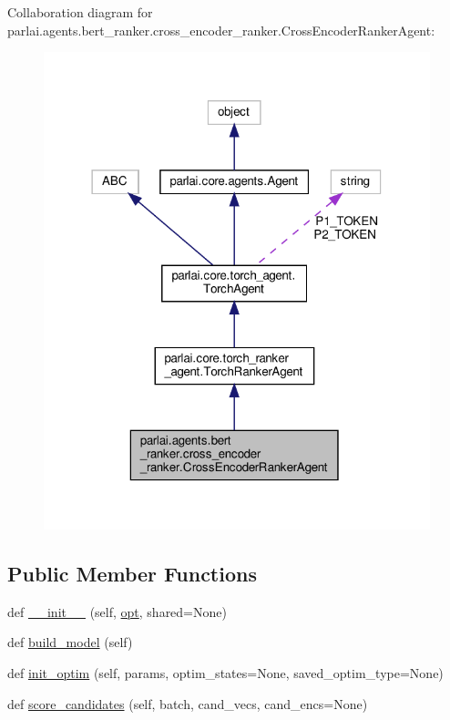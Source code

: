 Collaboration diagram for parlai.\+agents.\+bert\+\_\+ranker.\+cross\+\_\+encoder\+\_\+ranker.\+Cross\+Encoder\+Ranker\+Agent\+:
\nopagebreak
\begin{figure}[H]
\begin{center}
\leavevmode
\includegraphics[width=318pt]{d6/da0/classparlai_1_1agents_1_1bert__ranker_1_1cross__encoder__ranker_1_1CrossEncoderRankerAgent__coll__graph}
\end{center}
\end{figure}
\subsection*{Public Member Functions}
\begin{DoxyCompactItemize}
\item 
def \hyperlink{classparlai_1_1agents_1_1bert__ranker_1_1cross__encoder__ranker_1_1CrossEncoderRankerAgent_ab7f5e55dec9f12dc4e4dccc48c682e63}{\+\_\+\+\_\+init\+\_\+\+\_\+} (self, \hyperlink{classparlai_1_1core_1_1torch__agent_1_1TorchAgent_a785bb920cf8c8afc3e9bf6a8b77e335a}{opt}, shared=None)
\item 
def \hyperlink{classparlai_1_1agents_1_1bert__ranker_1_1cross__encoder__ranker_1_1CrossEncoderRankerAgent_a0754f7cf281a0223667ffb82c846a843}{build\+\_\+model} (self)
\item 
def \hyperlink{classparlai_1_1agents_1_1bert__ranker_1_1cross__encoder__ranker_1_1CrossEncoderRankerAgent_aedbc5976f08f86c9587c0b7486879846}{init\+\_\+optim} (self, params, optim\+\_\+states=None, saved\+\_\+optim\+\_\+type=None)
\item 
def \hyperlink{classparlai_1_1agents_1_1bert__ranker_1_1cross__encoder__ranker_1_1CrossEncoderRankerAgent_a8d75c4d4bddd44381b232a974469c432}{score\+\_\+candidates} (self, batch, cand\+\_\+vecs, cand\+\_\+encs=None)
\end{DoxyCompactItemize}
